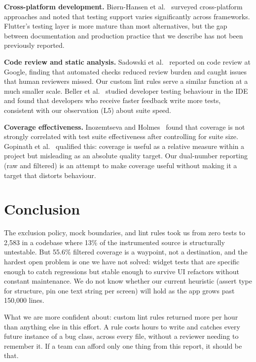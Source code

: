 \documentclass[10pt,journal,compsoc]{IEEEtran}
\begin{document}
\textbf{Cross-platform development.}
Bi{\o}rn-Hansen et al.~\cite{biorn2020flutter} surveyed cross-platform
approaches and noted that testing support varies significantly across
frameworks. Flutter's testing layer is more mature than most
alternatives, but the gap between documentation and production practice
that we describe has not been previously reported.

\textbf{Code review and static analysis.}
Sadowski et al.~\cite{sadowski2018lessons} reported on code review at
Google, finding that automated checks reduced review burden and caught
issues that human reviewers missed. Our custom lint rules serve a
similar function at a much smaller scale.
Beller et al.~\cite{beller2019developer} studied developer testing
behaviour in the IDE and found that developers who receive faster
feedback write more tests, consistent with our observation (L5) about
suite speed.

\textbf{Coverage effectiveness.}
Inozemtseva and Holmes~\cite{inozemtseva2014coverage} found that
coverage is not strongly correlated with test suite effectiveness after
controlling for suite size. Gopinath et al.~\cite{gopinath2014code}
qualified this: coverage is useful as a relative
measure within a project but misleading as an absolute quality target.
Our dual-number reporting (raw and filtered) is an attempt to make
coverage useful without making it a target that distorts behaviour.


\section{Conclusion}
\label{sec:conclusion}

The exclusion policy, mock boundaries, and lint rules took us from zero
tests to 2,583 in a codebase where 13\% of the instrumented source is
structurally untestable. But 55.6\% filtered coverage is a waypoint, not
a destination, and the hardest open problem is one we have not solved:
widget tests that are specific enough to catch regressions but stable
enough to survive UI refactors without constant maintenance. We do not
know whether our current heuristic (assert type for structure, pin one
text string per screen) will hold as the app grows past 150,000 lines.

What we are more confident about: custom lint rules returned more per
hour than anything else in this effort. A rule costs hours to write and
catches every future instance of a bug class, across every file, without
a reviewer needing to remember it. If a team can afford only one thing
from this report, it should be that.




\end{document}
